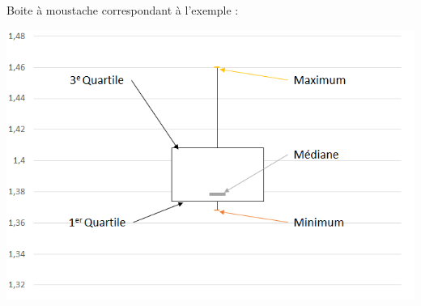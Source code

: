 \begin{myex}
	Boite à moustache correspondant à l'exemple :
		\begin{center}
		 \includegraphics[scale=0.67]{img/moustache}
	\end{center}
\end{myex}